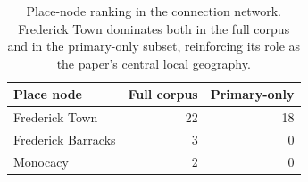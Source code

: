 \begin{table}[t]
\centering
\small
\begin{tabular}{lrr}
\toprule
Place node & Full corpus & Primary-only \\
\midrule
Frederick Town & 22 & 18 \\
Frederick Barracks & 3 & 0 \\
Monocacy & 2 & 0 \\
\bottomrule
\end{tabular}
\caption{Place-node ranking in the connection network. Frederick Town dominates both in the full corpus and in the primary-only subset, reinforcing its role as the paper's central local geography.}
\label{tab:placenodes}
\end{table}
